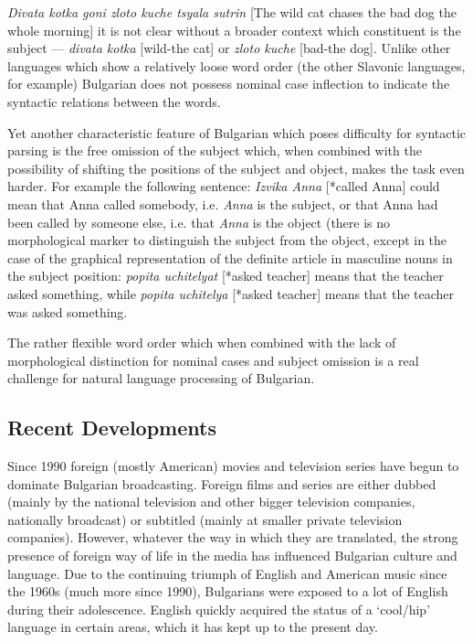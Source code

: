 \documentclass[]{../../metanetpaper}
\begin{document}
\begin{multicols}{2}
 \textit{{Divata kotka goni zloto kuche tsyala sutrin}} [The wild cat chases the bad dog the whole morning] it is not clear without a broader context which constituent is the subject — \textit{{divata kotka}} [wild-the cat] or \textit{{zloto kuche}} [bad-the dog]. Unlike other languages which show a relatively loose word order (the other Slavonic languages, for example) Bulgarian does not possess nominal case inflection to indicate the syntactic relations between the words.

Yet another characteristic feature of Bulgarian which poses difficulty for syntactic parsing is the free omission of the subject which, when combined with the possibility of shifting the positions of the subject and object, makes the task even harder. For example the following sentence: \textit{{Izvika Anna}} [*called Anna] could mean that Anna called somebody, i.e.  \textit{Anna} is the subject, or that Anna had been called by someone else, i.e. that  \textit{Anna} is the object (there is no morphological marker to distinguish the subject from the object, except in the case of the graphical representation of the definite article in masculine nouns in the subject position: \textit{{popita uchitelyat}} [*asked teacher] means that the teacher asked something, while \textit{{popita uchitelya}} [*asked teacher] means that the teacher was asked something. 

The rather flexible word order which when combined with the lack of morphological distinction for nominal cases and subject omission is a real challenge for natural language processing of Bulgarian.

\subsection{Recent Developments}

Since 1990 foreign (mostly American) movies and television series have begun to dominate Bulgarian broadcasting. Foreign films and series are either dubbed (mainly by the national television and other bigger television companies, nationally broadcast) or subtitled (mainly at smaller private television companies). However, whatever the way in which they are translated, the strong presence of foreign way of life in the media has influenced Bulgarian culture and language. Due to the continuing triumph of English and American music since the 1960s (much more since 1990), Bulgarians were exposed to a lot of English during their adolescence. English quickly acquired the status of a ‘cool/hip’ language in certain areas, which it has kept up to the present day. 


\end{multicols}
\end{document}
